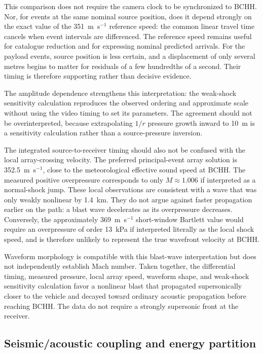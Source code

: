 \documentclass[]{seismica}
\begin{document}
This comparison does not require the camera clock to be synchronized to BCHH.
Nor, for events at the same nominal source position, does it depend strongly on
the exact value of the 351~m~s$^{-1}$ reference speed: the common linear travel
time cancels when event intervals are differenced. The reference speed remains
useful for catalogue reduction and for expressing nominal predicted arrivals.
For the payload events, source position is less certain, and a displacement of
only several metres begins to matter for residuals of a few hundredths of a
second. Their timing is therefore supporting rather than decisive evidence.

The amplitude dependence strengthens this interpretation: the weak-shock
sensitivity calculation reproduces the observed ordering and approximate scale
without using the video timing to set its parameters. The agreement should not
be overinterpreted, because extrapolating $1/r$ pressure growth inward to 10~m
is a sensitivity calculation rather than a source-pressure inversion.

The integrated source-to-receiver timing should also not be confused with the
local array-crossing velocity. The preferred principal-event array solution is
352.5~m~s$^{-1}$, close to the meteorological effective sound speed at BCHH.
The measured positive overpressure corresponds to only $M\approx1.006$ if
interpreted as a normal-shock jump. These local observations are consistent
with a wave that was only weakly nonlinear by 1.4~km. They do not argue against
faster propagation earlier on the path: a blast wave decelerates as its
overpressure decreases. Conversely, the approximately 369~m~s$^{-1}$
short-window Bartlett value would require an overpressure of order 13~kPa if
interpreted literally as the local shock speed, and is therefore unlikely to
represent the true wavefront velocity at BCHH.

Waveform morphology is compatible with this blast-wave interpretation but
does not independently establish Mach number. Taken together, the differential
timing, measured pressure, local array speed, waveform shape, and weak-shock
sensitivity calculation favor a nonlinear blast that propagated supersonically
closer to the vehicle and decayed toward ordinary acoustic propagation before
reaching BCHH. The data do not require a strongly supersonic front at the
receiver.

\subsection{Seismic/acoustic coupling and energy partition}
\end{document}
